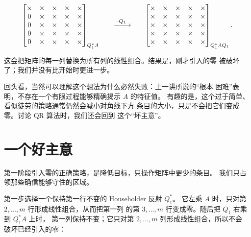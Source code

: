 \documentclass[UTF8,fontset=none,12pt]{ctexart}
\begin{document}
\[
\resizebox{0.92\textwidth}{!}{$
\begin{array}{c@{\qquad\xrightarrow{\ \cdot Q_1\ }\qquad}c}
\begin{bmatrix}
\times&\times&\times&\times&\times\\
0&\times&\times&\times&\times\\
0&\times&\times&\times&\times\\
0&\times&\times&\times&\times\\
0&\times&\times&\times&\times
\end{bmatrix}_{Q_1^*A}
&
\begin{bmatrix}
\mathbf{\times}&\mathbf{\times}&\mathbf{\times}&\mathbf{\times}&\mathbf{\times}\\
\mathbf{\times}&\mathbf{\times}&\mathbf{\times}&\mathbf{\times}&\mathbf{\times}\\
\mathbf{\times}&\mathbf{\times}&\mathbf{\times}&\mathbf{\times}&\mathbf{\times}\\
\mathbf{\times}&\mathbf{\times}&\mathbf{\times}&\mathbf{\times}&\mathbf{\times}\\
\mathbf{\times}&\mathbf{\times}&\mathbf{\times}&\mathbf{\times}&\mathbf{\times}
\end{bmatrix}_{Q_1^*AQ_1}.
\end{array}$}
\]

这会把矩阵的每一列替换为所有列的线性组合。结果是，刚才引入的零
被破坏了；我们并没有比开始时更进一步。

回头看，当然可以理解这个想法为什么必然失败：上一讲所说的“根本
困难”表明，不存在一个有限过程能够精确揭示 $A$ 的特征值。
有趣的是，这个过于简单、看似徒劳的策略通常仍然会减小对角线下方
条目的大小，只是不会把它们变成零。讨论 QR 算法时，我们还会回到
这个“坏主意”。

\section*{一个好主意}

第一阶段引入零的正确策略，是降低目标，只操作矩阵中更少的条目。
我们只占领那些确信能够守住的区域。

第一步选择一个保持第一行不变的 Householder 反射 $Q_1^*$。
它左乘 $A$ 时，只对第 $2,\ldots,m$ 行形成线性组合，从而把第一列
的第 $3,\ldots,m$ 行变成零。随后把 $Q_1$ 右乘到 $Q_1^*A$ 上时，
第一列保持不变；它只对第 $2,\ldots,m$ 列形成线性组合，所以不会
破坏已经引入的零：
\end{document}
